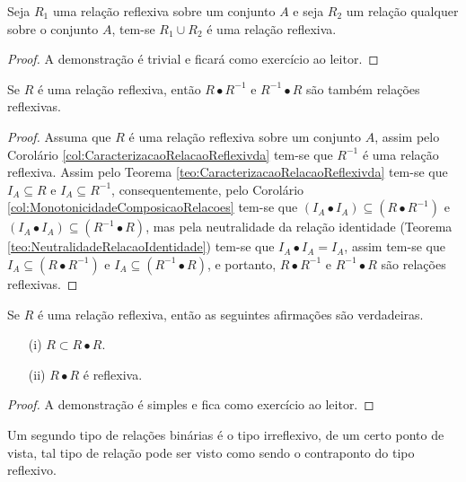 \begin{theorem}
	Seja $R_1$ uma relação reflexiva sobre um conjunto $A$ e seja $R_2$ um relação qualquer sobre o conjunto $A$, tem-se $R_1 \cup R_2$ é uma relação reflexiva.
\end{theorem}

\begin{proof}
	A demonstração é trivial e ficará como exercício ao leitor.
\end{proof}

\begin{theorem}
	Se $R$ é uma relação reflexiva, então $R \bullet R^{-1}$ e $R^{-1} \bullet R$ são também relações reflexivas.
\end{theorem}

\begin{proof}
	Assuma que $R$ é uma relação reflexiva sobre um conjunto $A$, assim pelo Corolário \ref{col:CaracterizacaoRelacaoReflexivda} tem-se que $R^{-1}$ é uma relação reflexiva. Assim pelo Teorema \ref{teo:CaracterizacaoRelacaoReflexivda} tem-se que $I_A \subseteq R$ e $I_A \subseteq R^{-1}$, consequentemente, pelo Corolário \ref{col:MonotonicidadeComposicaoRelacoes} tem-se que $(I_A \bullet I_A) \subseteq (R \bullet R^{-1})$ e $(I_A \bullet I_A) \subseteq (R^{-1} \bullet R)$, mas pela neutralidade da relação identidade (Teorema \ref{teo:NeutralidadeRelacaoIdentidade}) tem-se que $I_A \bullet I_A = I_A$, assim tem-se que  $I_A \subseteq (R \bullet R^{-1})$ e $I_A \subseteq (R^{-1} \bullet R)$, e portanto, $R \bullet R^{-1}$ e $R^{-1} \bullet R$ são relações reflexivas.
\end{proof}

\begin{theorem}
	Se $R$ é uma relação reflexiva, então as seguintes afirmações são verdadeiras.
	\begin{itemize}
		\item[(i)] $R \subset R \bullet R$.
		\item[(ii)] $R \bullet R$ é reflexiva.
	\end{itemize}
\end{theorem}

\begin{proof}
	A demonstração é simples e fica como exercício ao leitor.
\end{proof}

Um segundo tipo de relações binárias é o tipo irreflexivo, de um certo ponto de vista, tal tipo de relação pode ser visto como sendo o contraponto do tipo reflexivo.

